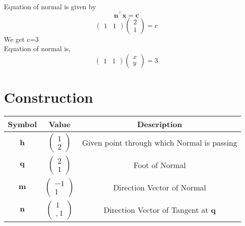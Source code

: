\documentclass[journal,10pt,twocolumn]{article}
\let\vec\mathbf
\newcommand{\myvec}[1]{\ensuremath{\begin{pmatrix}#1\end{pmatrix}}}
\begin{document}
Equation of normal is given by 
\begin{equation}
\vec{n^{\top}x=c}
\end{equation}
\begin{equation}
\begin{pmatrix}
1 & 1
\end{pmatrix}
\begin{pmatrix}
2 \\
1
\end{pmatrix}
=
c
\end{equation}
We get c=3\\
Equation of normal is,
\begin{equation}
\begin{pmatrix}
1 & 1
\end{pmatrix}
\begin{pmatrix}
x \\
y
\end{pmatrix}
=
3
\end{equation}
\section*{\large Construction}
{
\setlength\extrarowheight{5pt}
\begin{tabular}{|c|c|c|}
	\hline 
	\textbf{Symbol}&\textbf{Value}&\textbf{Description}\\[5pt]
	\hline
	$\vec{h}$&$\myvec{1 \\ 2}$&Given point through which Normal is passing\\[5pt]
	\hline
	$\vec{q}$&$\myvec{2 \\ 1}$&Foot of Normal\\[5pt]
	\hline
	$\vec{m}$ & $\myvec{-1 \\ 1}$ & Direction Vector of Normal\\[5pt]
	\hline 
	$\vec{n}$ & $\myvec{1 \\, 1}$ & Direction Vector of Tangent at $\vec{q}$\\
	\hline
\end{tabular}
}
\end{document}
